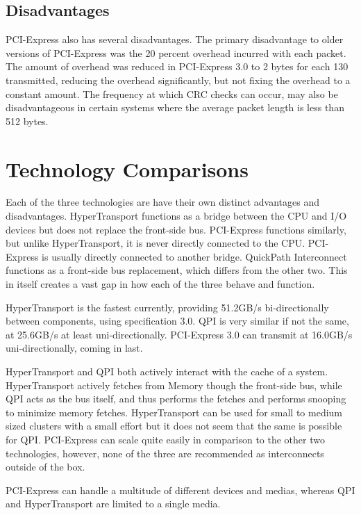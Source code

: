 \documentclass[conference]{IEEEtran}
\begin{document}
\subsection{Disadvantages}

PCI-Express also has several disadvantages. The primary disadvantage to older
versions of PCI-Express was the 20 percent overhead incurred with each packet.
The amount of overhead was reduced in PCI-Express 3.0 to 2 bytes for each 130
transmitted, reducing the overhead significantly, but not fixing the overhead to
a constant amount. The frequency at which CRC checks can occur, may also be
disadvantageous in certain systems where the average packet length is less than
512 bytes.

\section{Technology Comparisons}
Each of the three technologies are have their own distinct advantages and
disadvantages. HyperTransport functions as a bridge between the CPU and I/O
devices but does not replace the front-side bus. PCI-Express functions
similarly, but unlike HyperTransport, it is never directly connected to the
CPU. PCI-Express is usually directly connected to another bridge. QuickPath
Interconnect functions as a front-side bus replacement, which differs from the
other two. This in itself creates a vast gap in how each of the three behave and
function. 

HyperTransport is the fastest currently, providing 51.2GB/s bi-directionally
between components, using specification 3.0. QPI is very similar if not the
same, at 25.6GB/s at least uni-directionally. PCI-Express 3.0 can transmit at
16.0GB/s uni-directionally, coming in last.

HyperTransport and QPI both actively interact with the cache of a system.
HyperTransport actively fetches from Memory though the front-side bus, while QPI
acts as the bus itself, and thus performs the fetches and performs snooping to
minimize memory fetches. HyperTransport can be used for small to medium sized
clusters with a small effort but it does not seem that the same is possible for
QPI. PCI-Express can scale quite easily in comparison to the other two
technologies, however, none of the three are recommended as interconnects
outside of the box. 

PCI-Express can handle a multitude of different devices and medias, whereas QPI
and HyperTransport are limited to a single media. 
\end{document}
